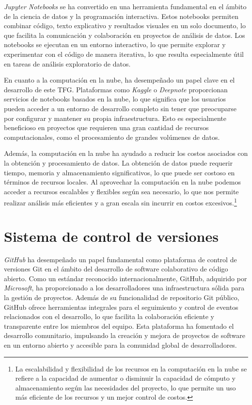 \textit{Jupyter Notebooks} se ha convertido en una herramienta fundamental en el ámbito de la ciencia de datos y 
la programación interactiva. Estos notebooks permiten combinar código, texto explicativo y resultados 
visuales en un solo documento, lo que facilita la comunicación y colaboración en proyectos de análisis 
de datos. Los notebooks se ejecutan en un entorno interactivo, lo que permite explorar y experimentar 
con el código de manera iterativa, lo que resulta especialmente útil en tareas de análisis exploratorio 
de datos.

En cuanto a la computación en la nube, ha desempeñado un papel clave en el desarrollo de este TFG.
Plataformas como \textit{Kaggle} o \textit{Deepnote} proporcionan servicios de notebooks basados en la nube, lo que 
significa que los usuarios pueden acceder a un entorno de desarrollo completo sin tener que preocuparse 
por configurar y mantener su propia infraestructura. Esto es especialmente beneficioso en proyectos 
que requieren una gran cantidad de recursos computacionales, como el procesamiento de grandes volúmenes
 de datos.

Además, la computación en la nube ha ayudado a reducir los costos asociados con la obtención y 
procesamiento de datos. La obtención de datos puede requerir tiempo, memoria y almacenamiento 
significativos, lo que puede ser costoso en términos de recursos locales. Al aprovechar la computación 
en la nube podemos acceder a recursos escalables y flexibles según 
sea necesario, lo que nos permite realizar análisis más eficientes y a gran escala sin incurrir en 
costos excesivos.\footnote{La escalabilidad y flexibilidad de los recursos en la computación en la 
nube se refiere a la capacidad de aumentar o disminuir la capacidad de cómputo y almacenamiento 
según las necesidades del proyecto, lo que permite un uso más eficiente de los recursos y un mejor 
control de costos.}

\section{Sistema de control de versiones}

\textit{GitHub} ha desempeñado un papel fundamental como plataforma de control de versiones Git en el ámbito del 
desarrollo de software colaborativo de código abierto. Como un estándar reconocido internacionalmente, 
GitHub, adquirido por \textit{Microsoft}, ha proporcionado a los desarrolladores una infraestructura sólida para
la gestión de proyectos. Además de su funcionalidad de repositorio Git público, GitHub ofrece 
herramientas integrales para el seguimiento y control de eventos relacionados con el desarrollo, 
lo que facilita la colaboración eficiente y transparente entre los miembros del equipo. 
Esta plataforma ha fomentado el desarrollo comunitario, impulsando la creación y mejora de proyectos 
de software en un entorno abierto y accesible para la comunidad global de 
desarrolladores.

